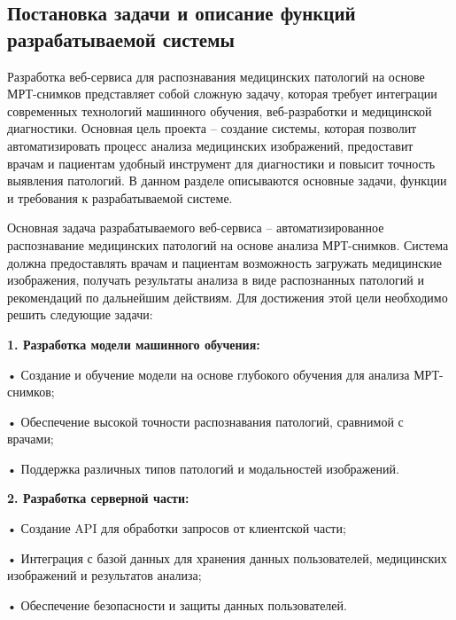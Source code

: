 \subtitlespace

\subsection*{ 
  \gostTitleFont
   Постановка задачи и описание функций разрабатываемой системы 
} 

\subtitlespace

{\gostFont

  \par \redline Разработка веб-сервиса для распознавания медицинских патологий на основе МРТ-снимков представляет собой сложную задачу, которая требует интеграции современных технологий машинного обучения, веб-разработки и медицинской диагностики. Основная цель проекта – создание системы, которая позволит автоматизировать процесс анализа медицинских изображений, предоставит врачам и пациентам удобный инструмент для диагностики и повысит точность выявления патологий. В данном разделе описываются основные задачи, функции и требования к разрабатываемой системе.

  \par \redline Основная задача разрабатываемого веб-сервиса – автоматизированное распознавание медицинских патологий на основе анализа МРТ-снимков. Система должна предоставлять врачам и пациентам возможность загружать медицинские изображения, получать результаты анализа в виде распознанных патологий и рекомендаций по дальнейшим действиям. Для достижения этой цели необходимо решить следующие задачи:

  \par \redline \textbf{1. Разработка модели машинного обучения:}
  \par \redline \hspace{0.3cm} • Создание и обучение модели на основе глубокого обучения для анализа МРТ-снимков;
  \par \redline \hspace{0.3cm} • Обеспечение высокой точности распознавания патологий, сравнимой с врачами;
  \par \redline \hspace{0.3cm} • Поддержка различных типов патологий и модальностей изображений.

  \par \redline \textbf{2. Разработка серверной части:}
  \par \redline \hspace{0.3cm} • Создание API для обработки запросов от клиентской части;
  \par \redline \hspace{0.3cm} • Интеграция с базой данных для хранения данных пользователей, медицинских изображений и результатов анализа;
  \par \redline \hspace{0.3cm} • Обеспечение безопасности и защиты данных пользователей.

}
